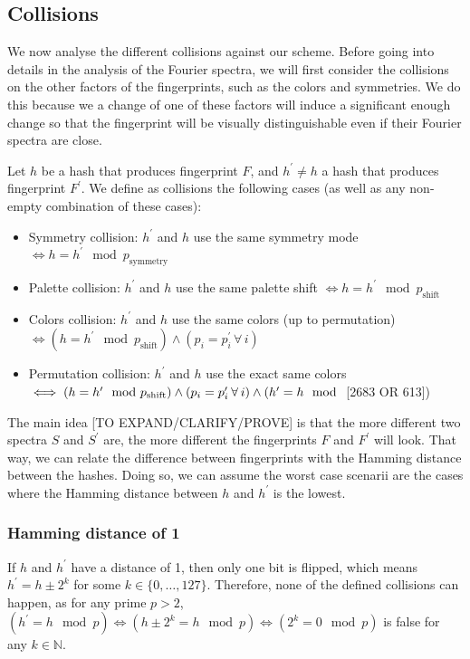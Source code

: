 \documentclass{article}
\begin{document}
\subsection{Collisions}
\newcommand{\foralls}{\hspace{2pt}\forall\hspace{2pt}}
We now analyse the different collisions against our scheme. Before going into details in the analysis of the Fourier spectra, we will first consider the collisions on the other factors of the fingerprints, such as the colors and symmetries. We do this because we a change of one of these factors will induce a significant enough change so that the fingerprint will be visually distinguishable even if their Fourier spectra are close.

Let $h$ be a hash that produces fingerprint $F$, and $h^\prime \neq h$ a hash that produces fingerprint $F^\prime$. We define as collisions the following cases (as well as any non-empty combination of these cases):
\begin{itemize}
	\item Symmetry collision: $h^\prime$ and $h$ use the same symmetry mode $\iff h = h^\prime \mod p_{\text{symmetry}}$
	\item Palette collision: $h^\prime$ and $h$ use the same palette shift $\iff h = h^\prime \mod p_{\text{shift}}$
	\item Colors collision: $h^\prime$ and $h$ use the same colors (up to permutation) $\iff (h = h^\prime \mod p_{\text{shift}}) \wedge (p_i = p^\prime_i \foralls i)$
	\item Permutation collision: $h^\prime$ and $h$ use the exact same colors $\iff (h = h^\prime \mod p_{\text{shift}}) \wedge (p_i = p^\prime_i \foralls i) \wedge (h^\prime = h \mod$ [2683 OR 613])
\end{itemize}

The main idea [TO EXPAND/CLARIFY/PROVE] is that the more different two spectra $S$ and $S^\prime$ are, the more different the fingerprints $F$ and $F^\prime$ will look. That way, we can relate the difference between fingerprints with the Hamming distance between the hashes. Doing so, we can assume the worst case scenarii are the cases where the Hamming distance between $h$ and $h^\prime$ is the lowest.

\subsubsection{Hamming distance of 1}
If $h$ and $h^\prime$ have a distance of 1, then only one bit is flipped, which means $h^\prime = h \pm 2^k$ for some $k \in \{0,\dotsc, 127\}$. Therefore, none of the defined collisions can happen, as for any prime $p > 2$, $(h^\prime = h \mod p) \iff (h \pm 2^k = h \mod p) \iff (2^k = 0 \mod p)$ is false for any $k\in \mathbb{N}$.
\end{document}
